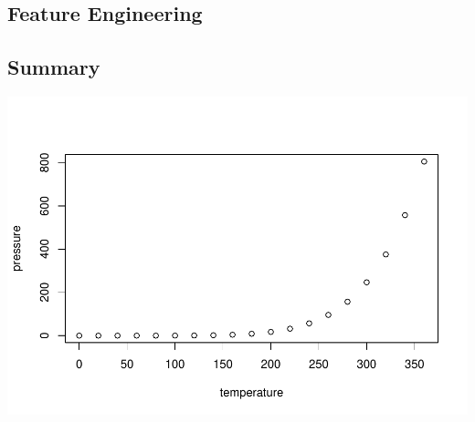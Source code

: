 \documentclass[
]{article}
\begin{document}
\subsection{Feature Engineering}

\subsection{Summary}

\includegraphics{Visualisation_Analysis_files/figure-latex/summary-1.pdf}
\end{document}
